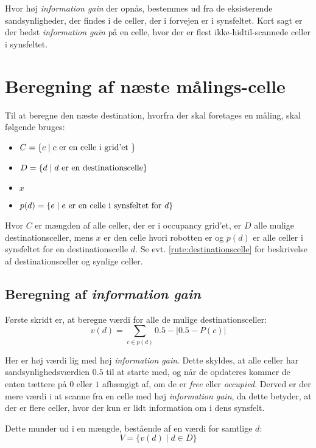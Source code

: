 Hvor høj \textit{information gain} der opnås, bestemmes ud fra de eksisterende sandsynligheder, der findes i de celler, der i forvejen er i synsfeltet.
Kort sagt er der bedst \textit{information gain} på en celle, hvor der er flest ikke-hidtil-scannede celler i synsfeltet.

\section{Beregning af næste målings-celle}
Til at beregne den næste destination, hvorfra der skal foretages en måling, skal følgende bruges:
\begin{itemize}
\item{$C = \{ c \mid c \textnormal{ er en celle i grid'et } \}$}
\item{$D = \{ d \mid d \textnormal{ er en destinationscelle}\}$}
\item{$x$}
\item{$p(d) = \{ e \mid e \textnormal{ er en celle i synsfeltet for } d \}$}
\end{itemize}
Hvor $C$ er mængden af alle celler, der er i occupancy grid'et, er $D$ alle mulige destinationsceller, mens $x$ er den celle hvori robotten er og $p(d)$ er alle celler i synsfeltet for en destinationscelle $d$.
Se evt. \cref{rute:destinationscelle} for beskrivelse af destinationsceller og synlige celler.

\subsection{Beregning af \textit{information gain}}
Første skridt er, at beregne værdi for alle de mulige destinationsceller:
\begin{equation}
v(d) = \sum_{c \in p(d)} 0.5-|0.5 - P(c)|
\end{equation}

Her er høj værdi lig med høj \textit{information gain}.
Dette skyldes, at alle celler har sandsynlighedsværdien $0.5$ til at starte med, og når de opdateres kommer de enten tættere på $0$ eller $1$ afhængigt af, om de er \textit{free} eller \textit{occupied}.
Derved er der mere værdi i at scanne fra en celle med høj \textit{information gain}, da dette betyder, at der er flere celler, hvor der kun er lidt information om i dens synsfelt.

Dette munder ud i en mængde, bestående af en værdi for samtlige $d$:
\begin{equation}
V = \{ v(d) \mid d \in D \}
\end{equation}

